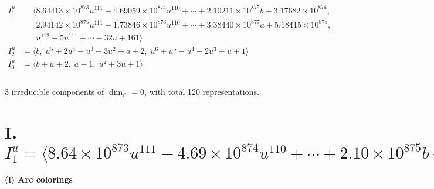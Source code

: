 \documentclass[1p]{elsarticle_modified}
\theoremstyle{definition}
\begin{document}
\begin{align*}
I^u_{1}&=\langle 
8.64413\times10^{873} u^{111}-4.69059\times10^{874} u^{110}+\cdots+2.10211\times10^{875} b+3.17682\times10^{876},\\
\phantom{I^u_{1}}&\phantom{= \langle  }2.94142\times10^{875} u^{111}-1.73846\times10^{876} u^{110}+\cdots+3.38440\times10^{877} a+5.18415\times10^{878},\\
\phantom{I^u_{1}}&\phantom{= \langle  }u^{112}-5 u^{111}+\cdots-32 u+161\rangle \\
I^u_{2}&=\langle 
b,\;u^5+2 u^4- u^3-3 u^2+a+2,\;u^6+u^5- u^4-2 u^3+u+1\rangle \\
I^u_{3}&=\langle 
b+u+2,\;a-1,\;u^2+3 u+1\rangle \\
\\
\end{align*}
\raggedright * 3 irreducible components of $\dim_{\mathbb{C}}=0$, with total 120 representations.\\
\newpage
\renewcommand{\arraystretch}{1}
\centering \section*{I. $I^u_{1}= \langle 8.64\times10^{873} u^{111}-4.69\times10^{874} u^{110}+\cdots+2.10\times10^{875} b+3.18\times10^{876},\;2.94\times10^{875} u^{111}-1.74\times10^{876} u^{110}+\cdots+3.38\times10^{877} a+5.18\times10^{878},\;u^{112}-5 u^{111}+\cdots-32 u+161 \rangle$}
\flushleft \textbf{(i) Arc colorings}\\
\end{document}
